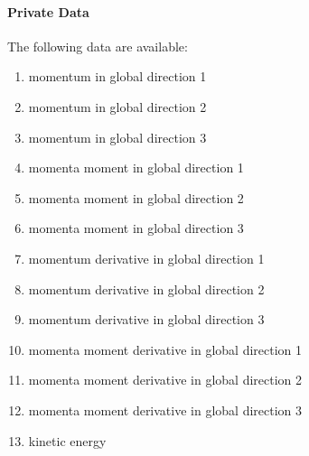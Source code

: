 \paragraph{Private Data}
The following data are available:
\begin{enumerate}
\item {} momentum in global direction 1
\item {} momentum in global direction 2
\item {} momentum in global direction 3
\item {} momenta moment in global direction 1
\item {} momenta moment in global direction 2
\item {} momenta moment in global direction 3
\item {} momentum derivative in global direction 1
\item {} momentum derivative in global direction 2
\item {} momentum derivative in global direction 3
\item {} momenta moment derivative in global direction 1
\item {} momenta moment derivative in global direction 2
\item {} momenta moment derivative in global direction 3
\item {} kinetic energy
\end{enumerate}





